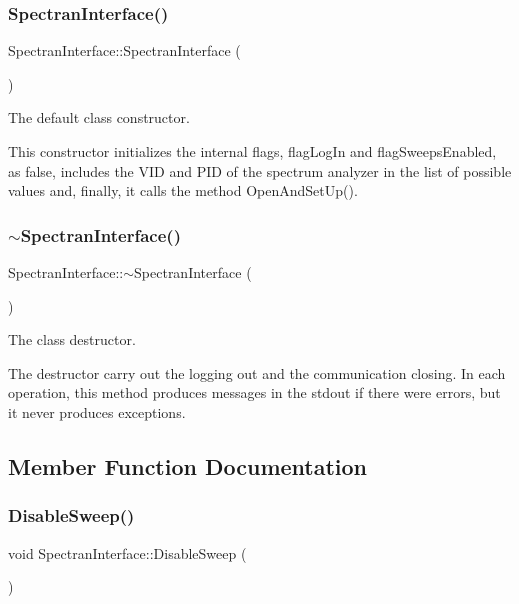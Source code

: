 \subsubsection{\texorpdfstring{Spectran\+Interface()}{SpectranInterface()}}
{\footnotesize\ttfamily Spectran\+Interface\+::\+Spectran\+Interface (\begin{DoxyParamCaption}{ }\end{DoxyParamCaption})}



The default class constructor. 

This constructor initializes the internal flags, flag\+Log\+In and flag\+Sweeps\+Enabled, as false, includes the V\+ID and P\+ID of the spectrum analyzer in the list of possible values and, finally, it calls the method {\ttfamily Open\+And\+Set\+Up()}. \mbox{\label{classSpectranInterface_a52592fb5fe9d7734d869540826b47325}} 
\subsubsection{\texorpdfstring{$\sim$\+Spectran\+Interface()}{~SpectranInterface()}}
{\footnotesize\ttfamily Spectran\+Interface\+::$\sim$\+Spectran\+Interface (\begin{DoxyParamCaption}{ }\end{DoxyParamCaption})}



The class destructor. 

The destructor carry out the logging out and the communication closing. In each operation, this method produces messages in the {\ttfamily stdout} if there were errors, but it never produces exceptions. 

\subsection{Member Function Documentation}
\mbox{\label{classSpectranInterface_a68b1b1a6af802369cb146c69161d031d}} 
\subsubsection{\texorpdfstring{Disable\+Sweep()}{DisableSweep()}}
{\footnotesize\ttfamily void Spectran\+Interface\+::\+Disable\+Sweep (\begin{DoxyParamCaption}{ }\end{DoxyParamCaption})}



